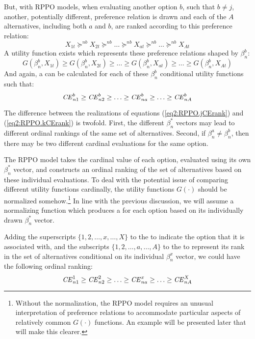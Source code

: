 \documentclass[../main.tex]{subfiles}
\begin{document}
But, with RPPO models, when evaluating another option $b$, such that $b \neq j$, another, potentially different, preference relation is drawn and each of the $A$ alternatives, including both $a$ and $b$, are ranked according to this preference relation:
\begin{equation}
	\label{eq2:RPPO.korank}
	X_{1t} \succcurlyeq^{nb} X_{2t} \succcurlyeq^{nb} \ldots \succcurlyeq^{nb} X_{at} \succcurlyeq^{nb} \ldots \succcurlyeq^{nb} X_{At}
\end{equation}
\noindent A utility function exists which represents these preference relations shaped by $\beta_n^b$:
\begin{equation}
	\label{eq2:RPPO.kurank}
	G(\beta_n^b,X_{1t}) \geq G(\beta_n^b,X_{2t}) \geq \ldots \geq G(\beta_n^b,X_{at}) \geq \ldots \geq G(\beta_n^b,X_{At})
\end{equation}
\noindent And again, a {\CE} can be calculated for each of these $\beta_n^b$ conditional utility functions such that:
\begin{equation}
	\label{eq2:RPPO.kCErank}
	{\ensuremath{\mathit{CE}}}^b_{n1} \geq {\ensuremath{\mathit{CE}}}^b_{n2} \geq \ldots \geq {\ensuremath{\mathit{CE}}}^b_{na} \geq \ldots \geq {\ensuremath{\mathit{CE}}}^b_{nA}
\end{equation}

The difference between the realizations of equations (\ref{eq2:RPPO.jCErank}) and (\ref{eq2:RPPO.kCErank}) is twofold.
First, the different $\beta_n^*$ vectors may lead to different ordinal rankings of the same set of alternatives.
Second, if $\beta_n^a \neq \beta_n^b$, then there may be two different cardinal evaluations for the same option.

The RPPO model takes the cardinal value of each option, evaluated using its own $\beta_n^*$  vector, and constructs an ordinal ranking of the set of alternatives based on these individual evaluations.
To deal with the potential issue of comparing different utility functions cardinally, the utility functions $G(\cdot)$ should be normalized somehow.\footnote{ Without the normalization, the RPPO model requires an unusual interpretation of preference relations to accommodate particular aspects of relatively common $G(\cdot)$ functions.
An example will be presented later that will make this clearer.} 
In line with the previous discussion, we will assume a normalizing function which produces a {\CE} for each option based on its individually drawn $\beta_n^*$ vector.

Adding the superscripts $\{1,2,\ldots,x,\ldots,X\}$  to the {\CE} to indicate the option that it is associated with, and the subscripts $\{1,2,\ldots,a,\ldots,A\}$ to the {\CE} to represent its rank in the set of alternatives conditional on its individual $\beta_n^x$ vector, we could have the following ordinal ranking:
\begin{equation}
	\label{eq2:RPPO.CErank.f}
	{\ensuremath{\mathit{CE}}}^1_{n1} \geq {\ensuremath{\mathit{CE}}}^2_{n2} \geq \ldots \geq {\ensuremath{\mathit{CE}}}^x_{na} \geq \ldots \geq {\ensuremath{\mathit{CE}}}^X_{nA}
\end{equation}
\end{document}
